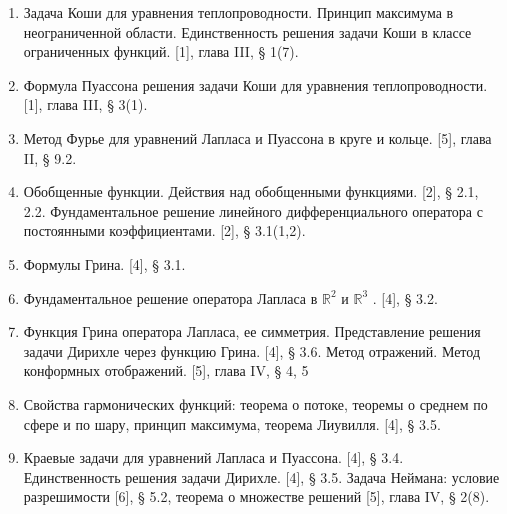 \begin{enumerate}
\item Задача Коши для уравнения теплопроводности. Принцип максимума в неограниченной области. Единственность
решения задачи Коши в классе ограниченных функций. [1], глава III, § 1(7).

\item Формула Пуассона решения задачи Коши для уравнения теплопроводности. [1], глава III, § 3(1).

\item Метод Фурье для уравнений Лапласа и Пуассона в круге и кольце. [5], глава II, § 9.2.

\item Обобщенные функции. Действия над обобщенными функциями. [2], § 2.1, 2.2. Фундаментальное решение линейного
дифференциального оператора с постоянными коэффициентами. [2], § 3.1(1,2).

\item Формулы Грина. [4], § 3.1.

\item Фундаментальное решение оператора Лапласа в $ \mathbb{R}^2 $ и $ \mathbb{R}^3 $ . [4], § 3.2.

\item Функция Грина оператора Лапласа, ее симметрия. Представление решения задачи Дирихле через функцию Грина. [4], §
3.6. Метод отражений. Метод конформных отображений. [5], глава IV, § 4, 5

\item Свойства гармонических функций: теорема о потоке, теоремы о среднем по сфере и по шару, принцип максимума,
теорема Лиувилля. [4], § 3.5.

\item Краевые задачи для уравнений Лапласа и Пуассона. [4], § 3.4. Единственность решения задачи Дирихле. [4], § 3.5.
Задача Неймана: условие разрешимости [6], § 5.2, теорема о множестве решений [5], глава IV, § 2(8).
\end{enumerate}


 